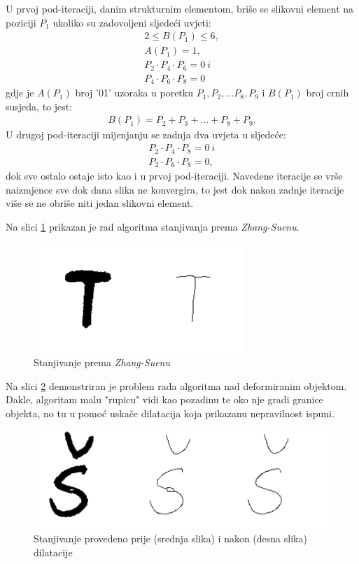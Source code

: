 U prvoj pod-iteraciji, danim strukturnim elementom, briše se slikovni element na poziciji $P_1$ ukoliko su zadovoljeni sljedeći uvjeti:
\begin{gather} 
    2 \leq B(P_1) \leq 6, \\
    A(P_1) = 1, \\
    P_2\cdot P_4\cdot P_6 = 0 \  i\\ 
    P_4\cdot P_6\cdot P_8 = 0
\end{gather}
gdje je $A(P_1)$ broj '01' uzoraka u poretku $P_1, P_2, ...P_8, P_9$ i $B(P_1)$ broj crnih susjeda, to jest: 
\begin{gather} 
    B(P_1) = P_2 + P_3 + ... + P_8 + P_9.
\end{gather}
U drugoj pod-iteraciji mijenjanju se zadnja dva uvjeta u sljedeće:
\begin{gather} 
    P_2\cdot P_4\cdot P_8 = 0 \  i \\
    P_2\cdot P_6\cdot P_8 = 0,
\end{gather}
dok sve ostalo ostaje isto kao i u prvoj pod-iteraciji. Navedene iteracije se vrše naizmjence sve dok dana slika ne konvergira, to jest dok nakon zadnje iteracije više se ne obriše niti jedan slikovni element.

Na slici \ref{fig:thinning_good} prikazan je rad algoritma stanjivanja prema \emph{Zhang-Suenu}.
\begin{figure}[htb]
    \centering
    \includegraphics[width=8cm]{images/thinning_good.jpg}
    \caption{Stanjivanje prema \emph{Zhang-Suenu}}
    \label{fig:thinning_good}
\end{figure}

Na slici \ref{fig:thinning_bad} demonstriran je problem rada algoritma nad deformiranim objektom. Dakle, algoritam malu "rupicu" vidi kao pozadinu te oko nje gradi granice objekta, no tu u pomoć uskače dilatacija koja prikazanu nepravilnost ispuni.

\begin{figure}[htb]
    \centering
    \includegraphics[width=12cm]{images/thinning_bad.jpg}
    \caption{Stanjivanje provedeno prije (srednja slika) i nakon (desna slika) dilatacije}
    \label{fig:thinning_bad}
\end{figure}

